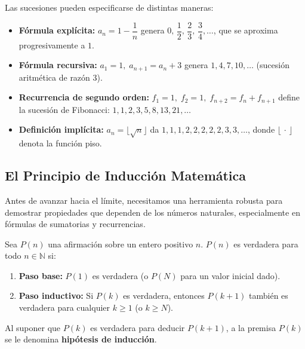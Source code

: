 \begin{example}
Las sucesiones pueden especificarse de distintas maneras:
\begin{itemize}
    \item \textbf{Fórmula explícita:} $a_n = 1 - \dfrac{1}{n}$ genera
          $0,\,\dfrac{1}{2},\,\dfrac{2}{3},\,\dfrac{3}{4}, \ldots$, que se aproxima
          progresivamente a $1$.
    \item \textbf{Fórmula recursiva:} $a_1 = 1,\; a_{n+1} = a_n + 3$ genera
          $1, 4, 7, 10, \ldots$ (sucesión aritmética de razón $3$).
    \item \textbf{Recurrencia de segundo orden:} $f_1 = 1,\; f_2 = 1,\;
          f_{n+2} = f_n + f_{n+1}$ define la sucesión de Fibonacci:
          $1, 1, 2, 3, 5, 8, 13, 21, \ldots$
    \item \textbf{Definición implícita:} $a_n = \lfloor \sqrt{n} \rfloor$ da
          $1, 1, 1, 2, 2, 2, 2, 2, 3, 3, \ldots$, donde $\lfloor\,\cdot\,\rfloor$
          denota la función piso.
\end{itemize}
\end{example}

\subsection{El Principio de Inducción Matemática}

Antes de avanzar hacia el límite, necesitamos una herramienta robusta para demostrar propiedades que dependen de los números naturales, especialmente en fórmulas de sumatorias y recurrencias.

\begin{theorem}
Sea $P(n)$ una afirmación sobre un entero positivo $n$. $P(n)$ es verdadera para todo $n \in \mathbb{N}$ si:
\begin{enumerate}
    \item \textbf{Paso base:} $P(1)$ es verdadera (o $P(N)$ para un valor inicial dado).
    \item \textbf{Paso inductivo:} Si $P(k)$ es verdadera, entonces $P(k+1)$ también es verdadera para cualquier $k \geq 1$ (o $k \geq N$).
\end{enumerate}
Al suponer que $P(k)$ es verdadera para deducir $P(k+1)$, a la premisa $P(k)$ se le denomina \textbf{hipótesis de inducción}.
\end{theorem}

